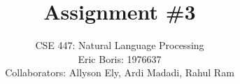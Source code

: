 \title{Assignment \#3} 
\author{\normalsize{CSE 447: Natural Language Processing}\\ 
\normalsize{Eric Boris: 1976637}\\
\normalsize{Collaborators: Allyson Ely, Ardi Madadi, Rahul Ram}}
\maketitle
